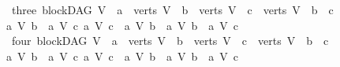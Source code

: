 \begin{isabellebody}
\ \ {\isacharbar}{\kern0pt}\ {\isacharparenleft}{\kern0pt}three{\isacharparenright}{\kern0pt}\ {\isachardoublequoteopen}{\isacharparenleft}{\kern0pt}blockDAG\ V\ {\isasymand}\ a\ {\isasymin}\ verts\ V\ {\isasymor}\ b\ {\isasymin}\ verts\ V\ {\isasymor}\ c\ {\isasymin}\ verts\ V{\isacharparenright}{\kern0pt}\ {\isasymand}\ b\ {\isasymnoteq}\ c\ \ {\isasymand}\ \isanewline
\ \ {\isasymnot}{\isacharparenleft}{\kern0pt}{\isacharparenleft}{\kern0pt}a\ {\isasymrightarrow}\isactrlsup {\isacharasterisk}{\kern0pt}\isactrlbsub V\isactrlesub \ b{\isacharparenright}{\kern0pt}\ {\isasymand}\ {\isasymnot}{\isacharparenleft}{\kern0pt}a\ {\isasymrightarrow}\isactrlsup {\isacharplus}{\kern0pt}\isactrlbsub V\isactrlesub \ c{\isacharparenright}{\kern0pt}{\isacharparenright}{\kern0pt}{\isasymand}\ {\isasymnot}{\isacharparenleft}{\kern0pt}{\isacharparenleft}{\kern0pt}a\ {\isasymrightarrow}\isactrlsup {\isacharasterisk}{\kern0pt}\isactrlbsub V\isactrlesub \ c{\isacharparenright}{\kern0pt}\ {\isasymand}\ {\isasymnot}{\isacharparenleft}{\kern0pt}a\ {\isasymrightarrow}\isactrlsup {\isacharplus}{\kern0pt}\isactrlbsub V\isactrlesub \ b{\isacharparenright}{\kern0pt}{\isacharparenright}{\kern0pt}\ {\isasymand}\ {\isacharparenleft}{\kern0pt}{\isacharparenleft}{\kern0pt}a\ {\isasymrightarrow}\isactrlsup {\isacharplus}{\kern0pt}\isactrlbsub V\isactrlesub \ b{\isacharparenright}{\kern0pt}\ {\isasymand}\ {\isacharparenleft}{\kern0pt}a\ {\isasymrightarrow}\isactrlsup {\isacharplus}{\kern0pt}\isactrlbsub V\isactrlesub \ c{\isacharparenright}{\kern0pt}{\isacharparenright}{\kern0pt}{\isachardoublequoteclose}\isanewline
\ \ {\isacharbar}{\kern0pt}\ {\isacharparenleft}{\kern0pt}four{\isacharparenright}{\kern0pt}\ {\isachardoublequoteopen}{\isacharparenleft}{\kern0pt}blockDAG\ V\ {\isasymand}\ a\ {\isasymin}\ verts\ V\ {\isasymor}\ b\ {\isasymin}\ verts\ V\ {\isasymor}\ c\ {\isasymin}\ verts\ V{\isacharparenright}{\kern0pt}\ {\isasymand}\ b\ {\isasymnoteq}\ c\ \ {\isasymand}\ \isanewline
\ \ {\isasymnot}{\isacharparenleft}{\kern0pt}{\isacharparenleft}{\kern0pt}a\ {\isasymrightarrow}\isactrlsup {\isacharasterisk}{\kern0pt}\isactrlbsub V\isactrlesub \ b{\isacharparenright}{\kern0pt}\ {\isasymand}\ {\isasymnot}{\isacharparenleft}{\kern0pt}a\ {\isasymrightarrow}\isactrlsup {\isacharplus}{\kern0pt}\isactrlbsub V\isactrlesub \ c{\isacharparenright}{\kern0pt}{\isacharparenright}{\kern0pt}{\isasymand}\ {\isasymnot}{\isacharparenleft}{\kern0pt}{\isacharparenleft}{\kern0pt}a\ {\isasymrightarrow}\isactrlsup {\isacharasterisk}{\kern0pt}\isactrlbsub V\isactrlesub \ c{\isacharparenright}{\kern0pt}\ {\isasymand}\ {\isasymnot}{\isacharparenleft}{\kern0pt}a\ {\isasymrightarrow}\isactrlsup {\isacharplus}{\kern0pt}\isactrlbsub V\isactrlesub \ b{\isacharparenright}{\kern0pt}{\isacharparenright}{\kern0pt}\ {\isasymand}\ {\isasymnot}{\isacharparenleft}{\kern0pt}{\isacharparenleft}{\kern0pt}a\ {\isasymrightarrow}\isactrlsup {\isacharplus}{\kern0pt}\isactrlbsub V\isactrlesub \ b{\isacharparenright}{\kern0pt}\ {\isasymand}\ {\isacharparenleft}{\kern0pt}a\ {\isasymrightarrow}\isactrlsup {\isacharplus}{\kern0pt}\isactrlbsub V\isactrlesub \ c{\isacharparenright}{\kern0pt}{\isacharparenright}{\kern0pt}{\isachardoublequoteclose}\isanewline

\end{isabellebody}
